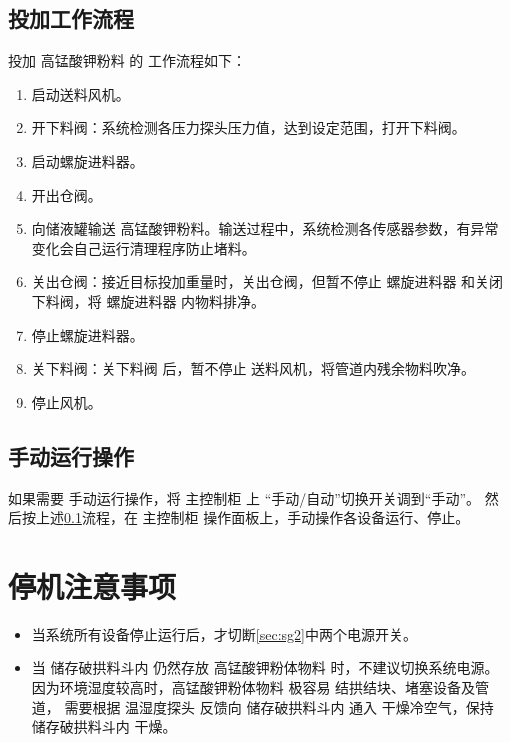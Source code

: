 \documentclass[UTF8,a4paper,12pt,titlepage]{ctexart}
\begin{document}
   \subsection{投加工作流程}\label{sec:sg4}
   投加 高锰酸钾粉料 的 工作流程如下：
   \begin{enumerate}
       \item 启动送料风机。
       \item 开下料阀：系统检测各压力探头压力值，达到设定范围，打开下料阀。
       \item 启动螺旋进料器。
       \item 开出仓阀。
       \item 向储液罐输送 高锰酸钾粉料。输送过程中，系统检测各传感器参数，有异常变化会自己运行清理程序防止堵料。
       \item 关出仓阀：接近目标投加重量时，关出仓阀，但暂不停止 螺旋进料器 和关闭下料阀，将 螺旋进料器 内物料排净。
       \item 停止螺旋进料器。
       \item 关下料阀：关下料阀 后，暂不停止 送料风机，将管道内残余物料吹净。
       \item 停止风机。
   \end{enumerate}

   \subsection{手动运行操作}
   如果需要 手动运行操作，将 主控制柜 上 “手动/自动”切换开关调到“手动”。
   然后按上述\ref{sec:sg4}流程，在 主控制柜 操作面板上，手动操作各设备运行、停止。
   

\section{停机注意事项}
   \begin{itemize}
       \item 当系统所有设备停止运行后，才切断\ref{sec:sg2}中两个电源开关。
       \item 当 储存破拱料斗内 仍然存放 高锰酸钾粉体物料 时，不建议切换系统电源。
           因为环境湿度较高时，高锰酸钾粉体物料 极容易 结拱结块、堵塞设备及管道，
           需要根据 温湿度探头 反馈向 储存破拱料斗内 通入 干燥冷空气，保持 储存破拱料斗内 干燥。
   \end{itemize}
\end{document}
